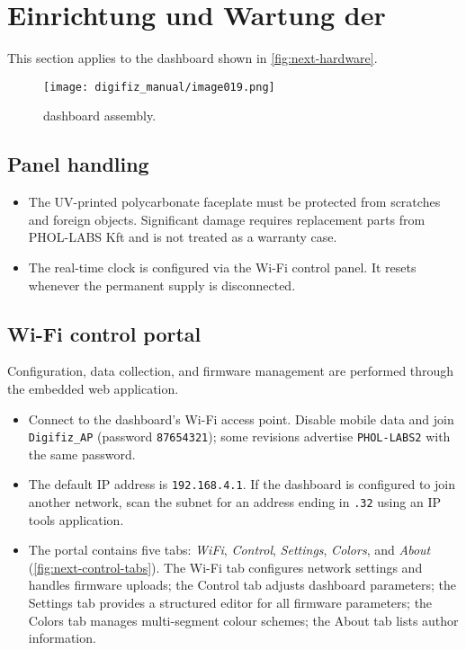 \chapter{Einrichtung und Wartung der \ReplicaNextLong{}}\label{ch:replica-next-setup}

This section applies to the \ReplicaNextLong{} dashboard shown in \autoref{fig:next-hardware}.

\begin{figure}[htbp]
    \centering
    \texttt{[image: digifiz\_manual/image019.png]}
    \caption{\ReplicaNextLong{} dashboard assembly.}
    \label{fig:next-hardware}
\end{figure}

\section{Panel handling}
\begin{itemize}
    \item The UV-printed polycarbonate faceplate must be protected from scratches and foreign objects. Significant damage requires replacement parts from PHOL-LABS Kft and is not treated as a warranty case.
    \item The real-time clock is configured via the Wi-Fi control panel. It resets whenever the permanent supply is disconnected.
\end{itemize}

\section{Wi-Fi control portal}
Configuration, data collection, and firmware management are performed through the embedded web application.
\begin{itemize}
    \item Connect to the dashboard's Wi-Fi access point. Disable mobile data and join \texttt{Digifiz\_AP} (password \texttt{87654321}); some revisions advertise \texttt{PHOL-LABS2} with the same password.
    \item The default IP address is \texttt{192.168.4.1}. If the dashboard is configured to join another network, scan the subnet for an address ending in \texttt{.32} using an IP tools application.
    \item The portal contains five tabs: \emph{WiFi}, \emph{Control}, \emph{Settings}, \emph{Colors}, and \emph{About} (\autoref{fig:next-control-tabs}). The Wi-Fi tab configures network settings and handles firmware uploads; the Control tab adjusts dashboard parameters; the Settings tab provides a structured editor for all firmware parameters; the Colors tab manages multi-segment colour schemes; the About tab lists author information.
\end{itemize}

